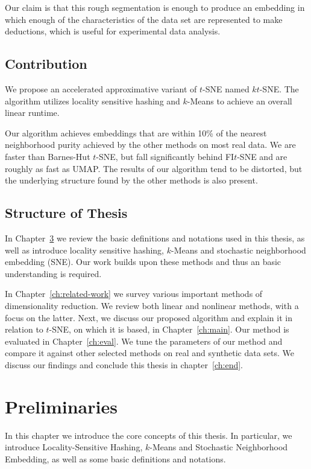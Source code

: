 Our claim is that this rough segmentation is enough to produce an embedding in
which enough of the characteristics of the data set are represented to make
deductions, which is useful for experimental data analysis.

\section{Contribution}

We propose an accelerated approximative variant of $t$-SNE named $kt$-SNE. The
algorithm utilizes locality sensitive hashing and $k$-Means to achieve
an overall linear runtime.

Our algorithm achieves embeddings that are within 10\% of the nearest
neighborhood purity achieved by the other methods on most real data. We are
faster than Barnes-Hut $t$-SNE, but fall significantly behind FI$t$-SNE and are
roughly as fast as UMAP. The results of our algorithm tend to be distorted, but
the underlying structure found by the other methods is also present.

\section{Structure of Thesis}

In Chapter~\ref{ch:prelim} we review the basic definitions and notations
used in this thesis, as well as introduce locality sensitive hashing, $k$-Means
and stochastic neighborhood embedding (SNE). Our work builds upon these methods
and thus an basic understanding is required.

In Chapter~\ref{ch:related-work} we survey various important methods of
dimensionality reduction. We review both linear and nonlinear methods, with a
focus on the latter.  Next, we discuss our proposed algorithm and explain it in
relation to $t$-SNE, on which it is based, in Chapter~\ref{ch:main}. Our
method is evaluated in Chapter~\ref{ch:eval}. We tune the parameters of our
method and compare it against other selected methods on real and synthetic data
sets. We discuss our findings and conclude this thesis in chapter~\ref{ch:end}.

\chapter{Preliminaries}\label{ch:prelim}

In this chapter we introduce the core concepts of this thesis. In particular, we introduce
Locality-Sensitive Hashing, $k$-Means and Stochastic Neighborhood Embedding, as well as
some basic definitions and notations.

